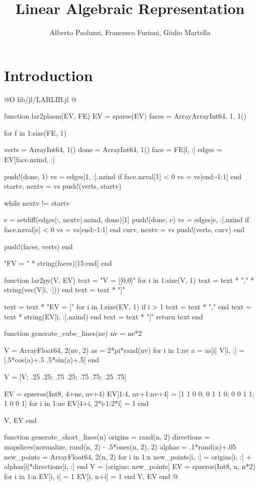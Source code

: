 \documentclass[10pt]{book}
\author{Alberto Paoluzzi, Francesco Furiani, Giulio Martella}
\title{Linear Algebraic Representation}
\begin{document}
\frontmatter
\maketitle
\tableofcontents

\mainmatter

\chapter{Introduction}

@O lib/jl/LARLIB.jl
@{function lar2plasm(EV, FE)
    EV = sparse(EV)
    faces = Array{Array{Int64, 1}, 1}()

    for f in 1:size(FE, 1)

        verts = Array{Int64, 1}()
        done = Array{Int64, 1}()
        face = FE[f, :]
        edges = EV[face.nzind, :]

        push!(done, 1)
        vs = edges[1, :].nzind
        if face.nzval[1] < 0
            vs = vs[end:-1:1]
        end
        startv, nextv = vs
        push!(verts, startv)

        while nextv != startv
            
            e = setdiff(edges[:, nextv].nzind, done)[1]
            push!(done, e)
            vs = edges[e, :].nzind
            if face.nzval[e] < 0
                vs = vs[end:-1:1]
            end
            curv, nextv = vs
            push!(verts, curv)
        end

        push!(faces, verts)
    end

    "FV = " * string(faces)[15:end]
end

function lar2py(V, EV)
    text = "V = [[0,0]"
    for i in 1:size(V, 1)
        text = text * "," * string(vec(V[i, :]))
    end
    text = text * "]\n"
    
    text = text * "EV = ["
    for i in 1:size(EV, 1)
        if i > 1 text = text * "," end
        text = text * string(EV[i, :].nzind)
    end
    text = text * "]"
    return text
end

function generate_cube_lines(ne)
    nv = ne*2
    
    V = Array{Float64, 2}(nv, 2)
    as = 2*pi*rand(nv)
    for i in 1:nv
        a = as[i]
        V[i, :] = [.5*cos(a)+.5 .5*sin(a)+.5]
    end
    
    V = [V; .25 .25; .75 .25; .75 .75; .25 .75]
    

    EV = spzeros(Int8, 4+ne, nv+4)
    EV[1:4, nv+1:nv+4] = [1 1 0 0; 0 1 1 0; 0 0 1 1; 1 0 0 1]
    for i in 1:ne
        EV[4+i, 2*i-1:2*i] = 1
    end
    
    V, EV
end


function generate_short_lines(n)
    origins = rand(n, 2)
    directions = mapslices(normalize, rand(n, 2) - .5*ones(n, 2), 2)
    alphas = .1*rand(n)+.05
    new_points = Array{Float64, 2}(n, 2)
    for i in 1:n
        new_points[i, :] = origins[i, :] + alphas[i]*directions[i, :]
    end
    V = [origins; new_points]
    EV = spzeros(Int8, n, n*2)
    for i in 1:n
        EV[i, i] = 1
        EV[i, n+i] = 1
    end
    V, EV
end
@}


\backmatter


{}

\end{document}
